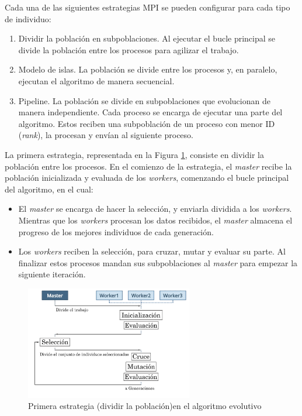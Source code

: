 	
	Cada una de las siguientes estrategias MPI se pueden configurar para cada tipo de individuo:

	\begin{enumerate}
		\item Dividir la población en subpoblaciones. Al ejecutar el bucle principal se divide la población entre los procesos para agilizar el trabajo.
		\item Modelo de islas. La población se divide entre los procesos y, en paralelo, ejecutan el algoritmo de manera secuencial.
		\item Pipeline. La población se divide en subpoblaciones que evolucionan de manera independiente. Cada proceso se encarga de ejecutar una parte del algoritmo. Estos reciben una subpoblación de un proceso con menor ID (\textit{rank}), la procesan y envían al siguiente proceso.
	\end{enumerate}
	
	La primera estrategia, representada en la Figura \ref{fig:pev_mpi1}, consiste en dividir la población entre los procesos. En el comienzo de la estrategia, el \textit{master} recibe la población inicializada y evaluada de los \textit{workers}, comenzando el bucle principal del algoritmo, en el cual:
	\begin{itemize}
		\item El \textit{master} se encarga de hacer la selección, y enviarla dividida a los \textit{workers}. Mientras que los \textit{workers} procesan los datos recibidos, el \textit{master} almacena el progreso de los mejores individuos de cada generación.
		\item Los \textit{workers} reciben la selección, para cruzar, mutar y evaluar su parte. Al finalizar estos procesos mandan sus subpoblaciones al \textit{master} para empezar la siguiente iteración.
	\end{itemize}
	
	\begin{figure}[!h]
		\centering
		\includegraphics[width=0.65\textwidth]{images/chapter_3/pev_mpi1}
		\caption{Primera estrategia (dividir la población)en el algoritmo evolutivo}
		\label{fig:pev_mpi1}
	\end{figure}
	
